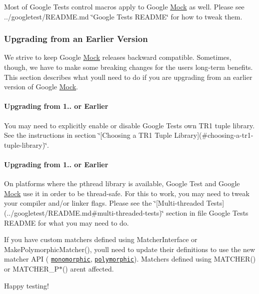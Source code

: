 Most of Google Test\textquotesingle{}s control macros apply to Google \hyperlink{classMock}{Mock} as well. Please see ../googletest/\+R\+E\+A\+D\+ME.md \char`\"{}\+Google Test\textquotesingle{}s R\+E\+A\+D\+M\+E\char`\"{} for how to tweak them.

\subsubsection*{Upgrading from an Earlier Version}

We strive to keep Google \hyperlink{classMock}{Mock} releases backward compatible. Sometimes, though, we have to make some breaking changes for the users\textquotesingle{} long-\/term benefits. This section describes what you\textquotesingle{}ll need to do if you are upgrading from an earlier version of Google \hyperlink{classMock}{Mock}.

\paragraph*{Upgrading from 1.. or Earlier}

You may need to explicitly enable or disable Google Test\textquotesingle{}s own T\+R1 tuple library. See the instructions in section \char`\"{}\mbox{[}\+Choosing a T\+R1 Tuple
\+Library\mbox{]}(\#choosing-\/a-\/tr1-\/tuple-\/library)\char`\"{}.

\paragraph*{Upgrading from 1.. or Earlier}

On platforms where the pthread library is available, Google Test and Google \hyperlink{classMock}{Mock} use it in order to be thread-\/safe. For this to work, you may need to tweak your compiler and/or linker flags. Please see the \char`\"{}\mbox{[}\+Multi-\/threaded Tests\mbox{]}(../googletest/\+R\+E\+A\+D\+M\+E.\+md\#multi-\/threaded-\/tests)\char`\"{} section in file Google Test\textquotesingle{}s R\+E\+A\+D\+ME for what you may need to do.

If you have custom matchers defined using {\ttfamily Matcher\+Interface} or {\ttfamily Make\+Polymorphic\+Matcher()}, you\textquotesingle{}ll need to update their definitions to use the new matcher A\+PI ( \href{./docs/CookBook.md#writing-new-monomorphic-matchers}{\tt monomorphic}, \href{./docs/CookBook.md#writing-new-polymorphic-matchers}{\tt polymorphic}). Matchers defined using {\ttfamily M\+A\+T\+C\+H\+E\+R()} or {\ttfamily M\+A\+T\+C\+H\+E\+R\+\_\+\+P$\ast$()} aren\textquotesingle{}t affected.

Happy testing! 